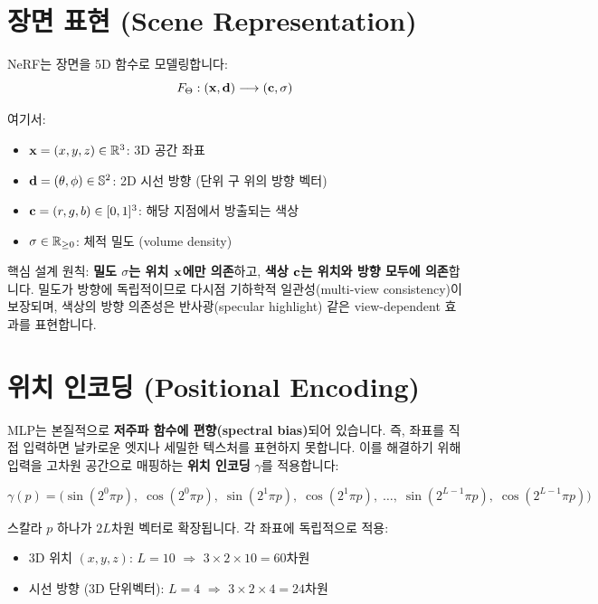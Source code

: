 \documentclass[11pt, a4paper]{report}
\begin{document}
\section{장면 표현 (Scene Representation)}

NeRF는 장면을 5D 함수로 모델링합니다:
\begin{equation}
  F_\Theta : (\mathbf{x}, \mathbf{d}) \longrightarrow (\mathbf{c}, \sigma)
  \label{eq:nerf_function}
\end{equation}

여기서:
\begin{itemize}[leftmargin=*]
  \item $\mathbf{x} = (x, y, z) \in \mathbb{R}^3$: 3D 공간 좌표
  \item $\mathbf{d} = (\theta, \phi) \in \mathbb{S}^2$: 2D 시선 방향 (단위 구 위의 방향 벡터)
  \item $\mathbf{c} = (r, g, b) \in [0,1]^3$: 해당 지점에서 방출되는 색상
  \item $\sigma \in \mathbb{R}_{\geq 0}$: 체적 밀도 (volume density)
\end{itemize}

\begin{importantnote}
핵심 설계 원칙: \textbf{밀도 $\sigma$는 위치 $\mathbf{x}$에만 의존}하고, \textbf{색상 $\mathbf{c}$는 위치와 방향 모두에 의존}합니다. 밀도가 방향에 독립적이므로 다시점 기하학적 일관성(multi-view consistency)이 보장되며, 색상의 방향 의존성은 반사광(specular highlight) 같은 view-dependent 효과를 표현합니다.
\end{importantnote}


\section{위치 인코딩 (Positional Encoding)}
\label{sec:pos_encoding}

MLP는 본질적으로 \textbf{저주파 함수에 편향(spectral bias)}되어 있습니다. 즉, 좌표를 직접 입력하면 날카로운 엣지나 세밀한 텍스처를 표현하지 못합니다. 이를 해결하기 위해 입력을 고차원 공간으로 매핑하는 \textbf{위치 인코딩} $\gamma$를 적용합니다:

\begin{equation}
\gamma(p) = \Big( \sin(2^0 \pi p),\; \cos(2^0 \pi p),\; \sin(2^1 \pi p),\; \cos(2^1 \pi p),\; \ldots,\; \sin(2^{L-1} \pi p),\; \cos(2^{L-1} \pi p) \Big)
\label{eq:pos_encoding}
\end{equation}

스칼라 $p$ 하나가 $2L$차원 벡터로 확장됩니다. 각 좌표에 독립적으로 적용:

\begin{itemize}[leftmargin=*]
  \item 3D 위치 $(x,y,z)$: $L=10$ $\Rightarrow$ $3 \times 2 \times 10 = 60$차원
  \item 시선 방향 (3D 단위벡터): $L=4$ $\Rightarrow$ $3 \times 2 \times 4 = 24$차원
\end{itemize}
\end{document}
